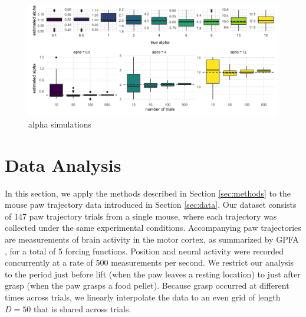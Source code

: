 \documentclass[preprint]{JASA}
\begin{document}
\begin{figure}
\includegraphics[width=\reprintcolumnwidth]{../output/fig_sim_alpha-1} \caption{alpha simulations}\label{fig:sim_alpha}
\end{figure}

\hypertarget{data-analysis}{%
\section{Data Analysis}\label{data-analysis}}

\label{sec:results}

In this section, we apply the methods described in Section
\ref{sec:methods} to the mouse paw trajectory data introduced in Section
\ref{sec:data}. Our dataset consists of 147 paw trajectory trials from a
single mouse, where each trajectory was collected under the same
experimental conditions. Accompanying paw trajectories are measurements
of brain activity in the motor cortex, as summarized by GPFA
\citep{yu2009}, for a total of 5 forcing functions. Position and neural
activity were recorded concurrently at a rate of 500 measurements per
second. We restrict our analysis to the period just before lift (when
the paw leaves a resting location) to just after grasp (when the paw
grasps a food pellet). Because grasp occurred at different times across
trials, we linearly interpolate the data to an even grid of length
\(D = 50\) that is shared across trials.
\end{document}
